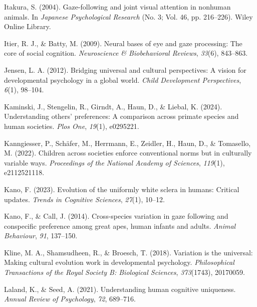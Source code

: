 \documentclass[
  man,floatsintext]{apa7}
\newlength{\cslhangindent}
\newlength{\cslentryspacingunit} %
\newenvironment{CSLReferences}[2] %
 {%
  \setlength{\parindent}{0pt}
  \ifodd #1
  \let\oldpar\par
  \def\par{\hangindent=\cslhangindent\oldpar}
  \fi
  \setlength{\parskip}{#2\cslentryspacingunit}
 }%
 {}
\begin{document}
\begin{CSLReferences}{1}{0}
\leavevmode{}%
Itakura, S. (2004). Gaze-following and joint visual attention in nonhuman animals. In \emph{Japanese Psychological Research} (No. 3; Vol. 46, pp. 216--226). Wiley Online Library.

\leavevmode{}%
Itier, R. J., \& Batty, M. (2009). Neural bases of eye and gaze processing: The core of social cognition. \emph{Neuroscience \& Biobehavioral Reviews}, \emph{33}(6), 843--863.

\leavevmode{}%
Jensen, L. A. (2012). Bridging universal and cultural perspectives: A vision for developmental psychology in a global world. \emph{Child Development Perspectives}, \emph{6}(1), 98--104.

\leavevmode{}%
Kaminski, J., Stengelin, R., Girndt, A., Haun, D., \& Liebal, K. (2024). Understanding others' preferences: A comparison across primate species and human societies. \emph{Plos One}, \emph{19}(1), e0295221.

\leavevmode{}%
Kanngiesser, P., Schäfer, M., Herrmann, E., Zeidler, H., Haun, D., \& Tomasello, M. (2022). Children across societies enforce conventional norms but in culturally variable ways. \emph{Proceedings of the National Academy of Sciences}, \emph{119}(1), e2112521118.

\leavevmode{}%
Kano, F. (2023). Evolution of the uniformly white sclera in humans: Critical updates. \emph{Trends in Cognitive Sciences}, \emph{27}(1), 10--12.

\leavevmode{}%
Kano, F., \& Call, J. (2014). Cross-species variation in gaze following and conspecific preference among great apes, human infants and adults. \emph{Animal Behaviour}, \emph{91}, 137--150.

\leavevmode{}%
Kline, M. A., Shamsudheen, R., \& Broesch, T. (2018). Variation is the universal: Making cultural evolution work in developmental psychology. \emph{Philosophical Transactions of the Royal Society B: Biological Sciences}, \emph{373}(1743), 20170059.

\leavevmode{}%
Laland, K., \& Seed, A. (2021). Understanding human cognitive uniqueness. \emph{Annual Review of Psychology}, \emph{72}, 689--716.


\end{CSLReferences}
\end{document}

